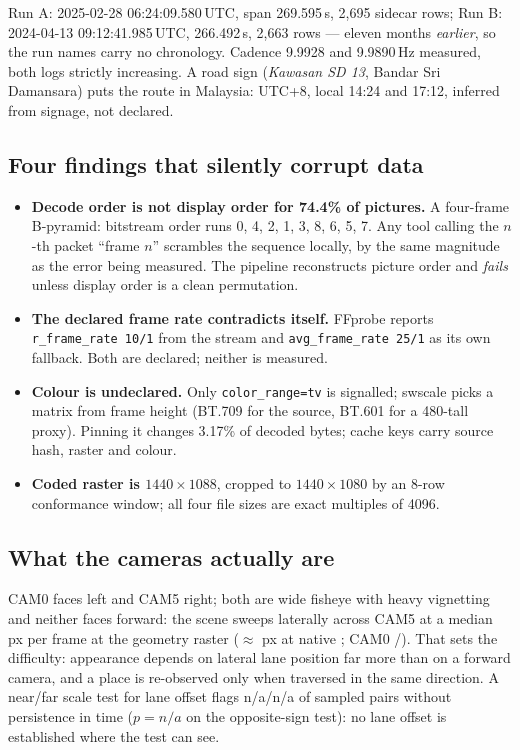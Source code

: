 \documentclass[10pt,a4paper]{article}
\providecommand{\LateralFlaggedCamZero}{n/a}
\providecommand{\LateralFlaggedCamFive}{n/a}
\providecommand{\LateralSignP}{n/a}
\begin{document}
{\small Run A: 2025-02-28 06:24:09.580\,UTC, span 269.595\,s, 2{,}695 sidecar
rows; Run B: 2024-04-13 09:12:41.985\,UTC, 266.492\,s, 2{,}663 rows --- eleven
months \emph{earlier}, so the run names carry no chronology. Cadence 9.9928 and
9.9890\,Hz measured, both logs strictly increasing. A road sign (\emph{Kawasan SD
13}, Bandar Sri Damansara) puts the route in Malaysia: UTC+8, local 14:24 and
17:12, inferred from signage, not declared.}

\subsection{Four findings that silently corrupt data}

\begin{itemize}
  \item \textbf{Decode order is not display order for 74.4\% of pictures.} A
  four-frame B-pyramid: bitstream order runs 0, 4, 2, 1, 3, 8, 6, 5, 7. Any tool
  calling the $n$-th packet ``frame $n$'' scrambles the sequence locally, by the
  same magnitude as the error being measured. The pipeline reconstructs picture
  order and \emph{fails} unless display order is a clean permutation.
  \item \textbf{The declared frame rate contradicts itself.} FFprobe reports
  \texttt{r\_frame\_rate 10/1} from the stream and \texttt{avg\_frame\_rate 25/1}
  as its own fallback. Both are declared; neither is measured.
  \item \textbf{Colour is undeclared.} Only \texttt{color\_range=tv} is signalled;
  swscale picks a matrix from frame height (BT.709 for the source, BT.601 for a
  480-tall proxy). Pinning it changes 3.17\% of decoded bytes; cache keys carry
  source hash, raster and colour.
  \item \textbf{Coded raster is $1440\times1088$}, cropped to $1440\times1080$ by
  an 8-row conformance window; all four file sizes are exact multiples of 4096.
\end{itemize}

\subsection{What the cameras actually are}

CAM0 faces left and CAM5 right; both are wide fisheye with heavy vignetting and
neither faces forward: the scene sweeps laterally across CAM5 at a median
\SweepRateCamFive{}\,px per frame at the \SweepRaster{} geometry raster
($\approx$\,\SweepRateCamFiveNative{}\,px at native \SweepNativeWidth{}; CAM0
\SweepRateCamZero{}/\SweepRateCamZeroNative{}). That sets the difficulty:
appearance depends on lateral lane position far more than on a forward camera,
and a place is re-observed only when traversed in the same direction. A near/far
scale test for lane offset flags \LateralFlaggedCamZero{}/\LateralFlaggedCamFive{}
of sampled pairs without persistence in time ($p{=}\LateralSignP$ on the
opposite-sign test): no lane offset is established where the test can see.
\end{document}
